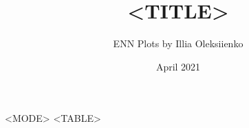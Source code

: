 \documentclass{article}
\title{<TITLE>}
\author{ENN Plots by Illia Oleksiienko}
\date{April 2021}
\begin{document}
\maketitle

\begin{center}
    \begin{table}[!ht]
    \caption{<CAPTION>}
    \begin{tabular}{<MODE>}
    <TABLE>
    \end{tabular}
\end{table}
\end{center}
\end{document}
